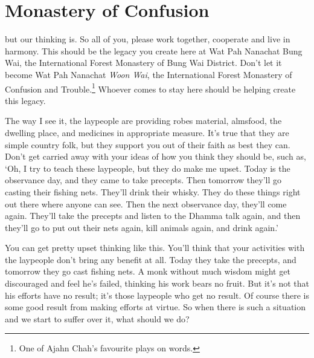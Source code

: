 

\chapter{Monastery of Confusion}

\vspace*{\baselineskip}
 but our thinking is. So all of you, please work together, cooperate and live in harmony. This should be the legacy you create here at Wat Pah Nanachat Bung Wai, the International Forest Monastery of Bung Wai District. Don't let it become Wat Pah Nanachat \textit{Woon Wai}, the International Forest Monastery of Confusion and Trouble.\footnote{One of Ajahn Chah's favourite plays on words.} Whoever comes to stay here should be helping create this legacy.

The way I see it, the laypeople are providing robes material, almsfood, the dwelling place, and medicines in appropriate measure. It's true that they are simple country folk, but they support you out of their faith as best they can. Don't get carried away with your ideas of how you think they should be, such as, `Oh, I try to teach these laypeople, but they do make me upset. Today is the observance day, and they came to take precepts. Then tomorrow they'll go casting their fishing nets. They'll drink their whisky. They do these things right out there where anyone can see. Then the next observance day, they'll come again. They'll take the precepts and listen to the Dhamma talk again, and then they'll go to put out their nets again, kill animals again, and drink again.'

You can get pretty upset thinking like this. You'll think that your activities with the laypeople don't bring any benefit at all. Today they take the precepts, and tomorrow they go cast fishing nets. A monk without much wisdom might get discouraged and feel he's failed, thinking his work bears no fruit. But it's not that his efforts have no result; it's those laypeople who get no result. Of course there is some good result from making efforts at virtue. So when there is such a situation and we start to suffer over it, what should we do?

